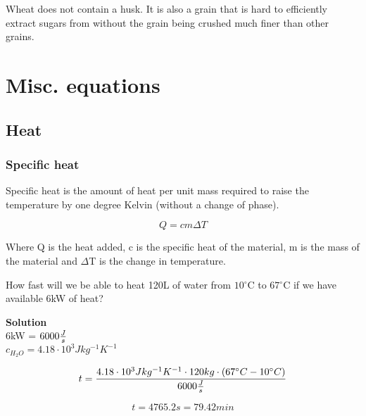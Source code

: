 \documentclass[11pt,fleqn]{book} %
\newcommand{\degree}{\ensuremath{^\circ}}
\begin{document}
Wheat does not contain a husk. It is also a grain that is hard to efficiently extract sugars from without the grain being crushed much finer than other grains.



\chapter{Misc. equations}

\section{Heat}



\subsection{Specific heat}

Specific heat is the amount of heat per unit mass required to raise the temperature by one degree Kelvin (without a change of phase).

\begin{equation}
Q = c m \Delta T
\end{equation}

Where Q is the heat added, c is the specific heat of the material, m is the mass of the material and $\Delta$T is the change in temperature.

\begin{exercise}
How fast will we be able to heat 120L of water from $10\degree$C to $67\degree$C if we have available 6kW of heat?

\textbf{Solution}\\
6kW = $6000 {J \over s}$\\
$c_{H_2 O} = 4.18 \cdot 10^3 J kg^{-1} K^{-1} $

\begin{equation*}
t = {{4.18 \cdot 10^3 J kg^{-1} K^{-1} \cdot 120kg \cdot (67\degree C -10\degree C) } \over {6000 {J \over s}}}
\end{equation*}

\begin{equation*}
t = 4765.2 s = 79.42 min
\end{equation*}

\end{exercise}
\end{document}
